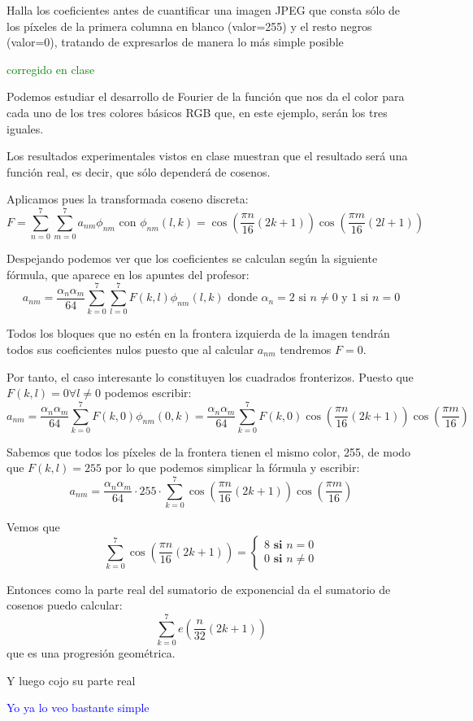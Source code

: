 \begin{problem}[7]
Halla los coeficientes antes de cuantificar una imagen JPEG que consta sólo de los píxeles de la primera columna en blanco (valor=255) y el resto negros (valor=0), tratando de expresarlos de manera lo más simple posible
\solution

\yoP

\textcolor{green}{corregido en clase}

Podemos estudiar el desarrollo de Fourier de la función que nos da el color para cada uno de los tres colores básicos RGB que, en este ejemplo, serán los tres iguales.

Los resultados experimentales vistos en clase muestran que el resultado será una función real, es decir, que sólo dependerá de cosenos.

Aplicamos pues la transformada coseno discreta:
\[F=\sum_{n=0}^7\sum_{m=0}^7 a_{nm}\phi_{nm} \text{ con } \phi_{nm}(l,k)=\cos\left(\frac{πn}{16}(2k+1) \right) \cos\left( \frac{πm}{16}(2l+1)\right)\]

Despejando podemos ver que los coeficientes se calculan según la siguiente fórmula, que aparece en los apuntes del profesor:
\[a_{nm}=\frac{α_nα_m}{64}\sum_{k=0}^7\sum_{l=0}^7F(k,l) \phi_{nm}(l,k) \text{ donde } α_n=2 \text{ si } n\neq0 \text{ y }1 \text{ si }  n = 0 \]

Todos los bloques que no estén en la frontera izquierda de la imagen tendrán todos sus coeficientes nulos puesto que al calcular $a_{nm}$ tendremos $F=0$.

Por tanto, el caso interesante lo constituyen los cuadrados fronterizos. Puesto que $F(k,l)=0 \forall l\neq 0$ podemos escribir:
\[a_{nm} = \frac{α_nα_m}{64}\sum_{k=0}^7F(k,0)\phi_{nm}(0,k)=\frac{α_nα_m}{64}\sum_{k=0}^7F(k,0)\cos\left(\frac{πn}{16}(2k+1) \right) \cos\left( \frac{πm}{16}\right)\]

Sabemos que todos los píxeles de la frontera tienen el mismo color, 255, de modo que $F(k,l)=255$ por lo que podemos simplicar la fórmula y escribir:
\[a_{nm}=\frac{α_nα_m}{64}\cdot 255 \cdot \sum_{k=0}^7\cos\left(\frac{πn}{16}(2k+1) \right) \cos\left( \frac{πm}{16}\right)\]

Vemos que
\[\sum_{k=0}^7\cos\left(\frac{πn}{16}(2k+1) \right) = \begin{cases}
8 \textbf{ si } n= 0\\
0 \textbf{ si } n\neq0
\end{cases}\]

Entonces como la parte real del sumatorio de exponencial da el sumatorio de cosenos puedo calcular:
\[ \sum_{k=0}^7e\left(\frac{n}{32}(2k+1) \right)\]
que es una progresión geométrica.

Y luego cojo su parte real

\textcolor{blue}{Yo ya lo veo bastante simple}

\end{problem}

